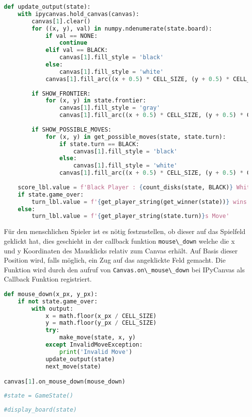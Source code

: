 \begin{lstlisting}[language=Python]
def update_output(state):
    with ipycanvas.hold_canvas(canvas):
        canvas[1].clear()
        for ((x, y), val) in numpy.ndenumerate(state.board):
            if val == NONE:
                continue
            elif val == BLACK:
                canvas[1].fill_style = 'black'
            else:
                canvas[1].fill_style = 'white'
            canvas[1].fill_arc((x + 0.5) * CELL_SIZE, (y + 0.5) * CELL_SIZE, CELL_SIZE / 2.2, 0, 2 * math.pi)
            
        if SHOW_FRONTIER:
            for (x, y) in state.frontier:
                canvas[1].fill_style = 'gray'
                canvas[1].fill_arc((x + 0.5) * CELL_SIZE, (y + 0.5) * CELL_SIZE, CELL_SIZE / 6, 0, 2 * math.pi)
        
        if SHOW_POSSIBLE_MOVES:
            for (x, y) in get_possible_moves(state, state.turn):
                if state.turn == BLACK:
                    canvas[1].fill_style = 'black'
                else:
                    canvas[1].fill_style = 'white'
                canvas[1].fill_arc((x + 0.5) * CELL_SIZE, (y + 0.5) * CELL_SIZE, CELL_SIZE / 6, 0, 2 * math.pi)
            
    score_lbl.value = f'Black Player : {count_disks(state, BLACK)} White Player : {count_disks(state, WHITE)}'
    if state.game_over:
        turn_lbl.value = f'{get_player_string(get_winner(state))} wins'
    else:
        turn_lbl.value = f'{get_player_string(state.turn)}s Move'
\end{lstlisting}

Für den menschlichen Spieler ist es nötig festzustellen, ob dieser auf
das Spielfeld geklickt hat, dies geschieht in der callback funktion
\passthrough{\lstinline!mouse\_down!} welche die x und y Koordinaten des
Mausklicks relativ zum Canvas erhält. Auf Basis dieser Position wird,
falls möglich, ein Zug auf das angeklickte Feld gemacht. Die Funktion
wird durch den aufruf von
\passthrough{\lstinline!Canvas.on\_mouse\_down!} bei IPyCanvas als
Callback Funktion registriert.

\begin{lstlisting}[language=Python]
def mouse_down(x_px, y_px):
    if not state.game_over:
        with output:
            x = math.floor(x_px / CELL_SIZE)
            y = math.floor(y_px / CELL_SIZE)
            try:
                make_move(state, x, y)
            except InvalidMoveException:
                print('Invalid Move')
            update_output(state)
            next_move(state)

canvas[1].on_mouse_down(mouse_down)
\end{lstlisting}

\begin{lstlisting}[language=Python]
#state = GameState()
\end{lstlisting}

\begin{lstlisting}[language=Python]
#display_board(state)
\end{lstlisting}

\begin{lstlisting}[language=Python]
\end{lstlisting}
